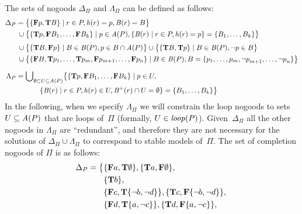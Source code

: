 \begin{Loesung}
\noindent\textnormal{%
The sets of nogoods $\Delta_\Pi$ and $\Lambda_\Pi$ can be defined as follows:
{\small
\begin{align*}
  \Delta_P = {} &  
  \big\{
  \{\mathbf{F}p,\mathbf{T}B\} 
  \mid r\in P,\mathit{h}(r)=p,\mathit{B}(r)=B
  \big\}
\\
  {} \cup {} & 
  \big\{ 
  \{\mathbf{T}p,\mathbf{F}B_1,\dots,\mathbf{F}B_k\}
  \mid
  p\in \mathit{A}(P),
  \{\mathit{B}(r)\mid r\in P,\mathit{h}(r)=p\}=
  \{B_1,\dots,B_k\}
  \big\}
\\[1mm]
  {} \cup {} & 
  \big\{ 
  \{\mathbf{T}B,\mathbf{F}p\}
  \mid
  B\in \mathit{B}(P),p\in B\cap\mathit{A}(P)
  \big\}
  \cup
  \big\{  
  \{\mathbf{T}B,\mathbf{T}p\}
  \mid
  B\in \mathit{B}(P),{\neg{p}}\in B
  \big\}
\\
  {} \cup {} & 
  \big\{ 
  \{\mathbf{F}B,\mathbf{T}p_1,\dots,\mathbf{T}p_m,\mathbf{F}p_{m+1},\dots,\mathbf{F}p_n\}
  \mid
  B\in \mathit{B}(P),B=\{p_1,\dots,p_m,{\neg{p}}_{m+1},\dots,{\neg{p}}_n\}  
  \big\}
\\[2mm]
  \Lambda_P = {} & 
  \textnormal{$\bigcup$}_{\emptyset\subset U\subseteq\mathit{A}(P)}
  \big\{  
  \{\mathbf{T}p,\mathbf{F}B_1,\dots,\mathbf{F}B_k\}
  \mid
  p\in U, {}
\\ & \qquad
  \{\mathit{B}(r)\mid r\in P,\mathit{h}(r)\in U,\mathit{B}^+(r)\cap U=\emptyset\}=
  \{B_1,\dots,B_k\}
  \big\}
\end{align*}}%
In the following, when we specify $\Lambda_\Pi$ 
we will constrain the loop nogoods to sets $U\subseteq\mathit{A}(P)$
that are loops of~$\Pi$ (formally, $U\in\mathit{loop}(P)$).
Given~$\Delta_\Pi$ all the other nogoods in $\Lambda_\Pi$ are
``redundant'', and therefore they are not necessary
for the solutions of $\Delta_\Pi\cup\Lambda_\Pi$ to correspond to stable models of~$\Pi$.
\newline
The set of completion nogoods of $\Pi$ is as follows:
\begin{align*}
  \Delta_\Pi = \big\{ &    
  \{\mathbf{F}a,\mathbf{T}\emptyset\},\{\mathbf{T}a,\mathbf{F}\emptyset\},
  {} \\ &
  \{\mathbf{T}b\},
  {} \\ &
  \{\mathbf{F}c,\mathbf{T}\{\naf b,\naf d\}\},  
  \{\mathbf{T}c,\mathbf{F}\{\naf b,\naf d\}\},
  {} \\ &
  \{\mathbf{F}d,\mathbf{T}\{a,\naf c\}\},  
  \{\mathbf{T}d,\mathbf{F}\{a,\naf c\}\},
  {} \\[1mm] &

\end{align*}}
\end{Loesung}
